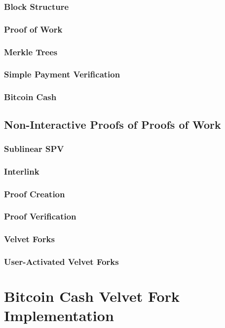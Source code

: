 \documentclass[11pt]{llncs}
\begin{document}
\subsubsection{Block Structure}
\subsubsection{Proof of Work}
\subsubsection{Merkle Trees}
\subsubsection{Simple Payment Verification}
\subsubsection{Bitcoin Cash}

\subsection{Non-Interactive Proofs of Proofs of Work}

\subsubsection{Sublinear SPV}
\subsubsection{Interlink}
\subsubsection{Proof Creation}
\subsubsection{Proof Verification}
\subsubsection{Velvet Forks}
\subsubsection{User-Activated Velvet Forks}

\section{Bitcoin Cash Velvet Fork Implementation}
\end{document}
